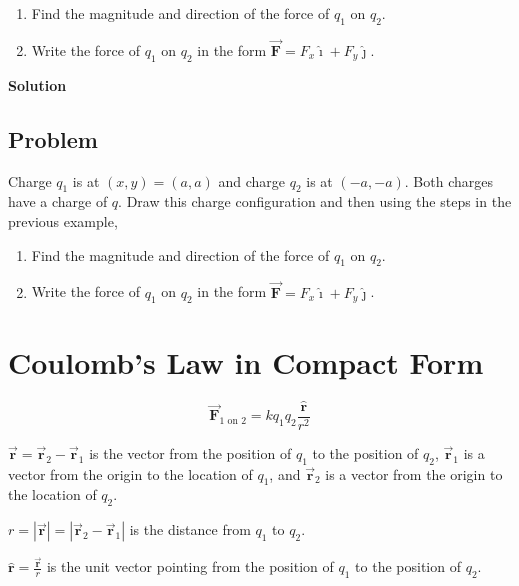 \documentclass{article}
\renewcommand{\mbox}{\text}
\newcommand{\ihat}[0]{\hat{\boldsymbol{\imath}}}
\newcommand{\jhat}[0]{\hat{\boldsymbol{\jmath}}}
\newcommand{\rhat}[0]{\hat{\mathbf{r}}}
\newcommand{\bfvec}[1]{\vec{\mathbf{#1}}}
\begin{document}
\begin{enumerate}

  \item Find the magnitude and direction of the force of $q_1$ on $q_2$.

  \item Write the force of $q_1$ on $q_2$ in the form $\bfvec{F}=F_x\ihat + F_y\jhat$.

\end{enumerate}

\ifsolutions
  \textbf{Solution}

\fi

\subsection{Problem}

Charge $q_1$ is at $(x,y)=(a,a)$ and charge $q_2$ is at $(-a, -a)$. Both charges have a charge of $q$. Draw this charge configuration and then using the steps in the previous example,

%

\begin{enumerate}

  \item Find the magnitude and direction of the force of $q_1$ on $q_2$.

  \item Write the force of $q_1$ on $q_2$ in the form $\bfvec{F}=F_x\ihat + F_y\jhat$.

\end{enumerate}

\section{Coulomb's Law in Compact Form}

\begin{equation}
\bfvec{F}_{1\mbox{ on } 2}=kq_1q_2\frac{\rhat}{r^2}
\end{equation}

$\bfvec{r}=\bfvec{r}_2-\bfvec{r}_1$ is the vector from the position of $q_1$ to the position of $q_2$, $\bfvec{r}_1$ is a vector from the origin to the location of $q_1$, and $\bfvec{r}_2$ is a vector from the origin to the location of $q_2$.

$r=|\bfvec{r}|=|\bfvec{r}_2-\bfvec{r}_1|$ is the distance from $q_1$ to $q_2$.

$\displaystyle\rhat=\frac{\bfvec{r}}{r}$ is the unit vector pointing from the position of $q_1$ to the position of $q_2$.
\end{document}
